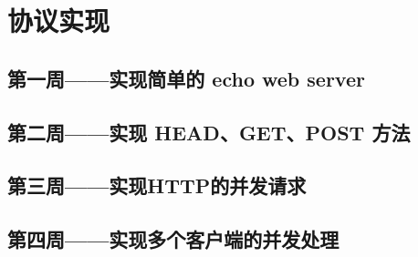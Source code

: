 \chapter{协议实现}


\section{第一周——实现简单的 echo web server}

\section{第二周——实现 HEAD、GET、POST 方法}

\section{第三周——实现HTTP的并发请求}

\section{第四周——实现多个客户端的并发处理}


